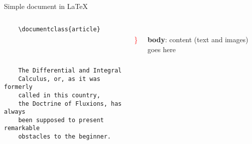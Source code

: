 \copyrightTim

\begin{frame}[fragile, t]{Simple document in \LaTeX}
	\begin{columns}
        \begin{column}{0.5\textwidth}
	\begin{verbatim} 
	\documentclass{article}

		
	

	The Differential and Integral 
	Calculus, or, as it was formerly 
	called in this country, 
	the Doctrine of Fluxions, has always 
	been supposed to present remarkable 
	obstacles to the beginner.

	
	\end{verbatim}
\end{column}
\begin{column}{0.05\textwidth}
	\phantom{{\Huge \textcolor{red}{ \} } }}
	\\[2cm]
	{\Huge \textcolor{red}{ \} } }
	
\end{column}
\begin{column}{0.4\textwidth}
	\\[2cm]
	\textbf{body}: content (text and images) goes here
\end{column}
\end{columns}

\end{frame}
